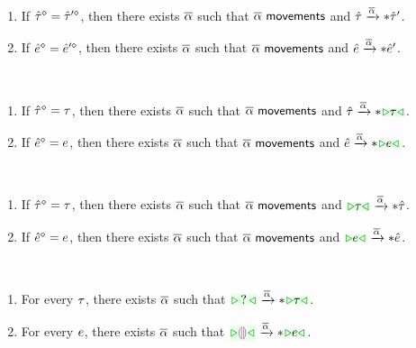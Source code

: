 \documentclass[formalism.tex]{subfiles}
\begin{document}
\begin{theorem}[name=Reachability] \
  \begin{enumerate}
    \item If $\hat{\tau}^{\diamond} = \hat{\tau}'^{\diamond}$, then there exists $\overline{\alpha}$ such that
      $\overline{\alpha} ~{\normalfont\textsf{movements}}$ and $\hat{\tau} \xrightarrow{\overline{\alpha}}* \hat{\tau}'$.

    \item If $\hat{e}^{\diamond} = \hat{e}'^{\diamond}$, then there exists $\overline{\alpha}$ such that
      $\overline{\alpha} ~{\normalfont\textsf{movements}}$ and $\hat{e} \xrightarrow{\overline{\alpha}}* \hat{e}'$.
  \end{enumerate}
\end{theorem}

\begin{lemma}[name=Reach Up] \
  \begin{enumerate}
    \item If $\hat{\tau}^{\diamond} = \tau$, then there exists $\overline{\alpha}$ such that $\overline{\alpha} ~{\normalfont\textsf{movements}}$
      and $\AUTActionIter{\ZTMV}{\ZTCursor{\TMV}}{\AIMV}$.

    \item If $\hat{e}^{\diamond} = e$, then there exists $\overline{\alpha}$ such that $\overline{\alpha} ~{\normalfont\textsf{movements}}$
      and $\AUEActionIter{\ZMV}{\ZTCursor{\EMV}}{\AIMV}$.
  \end{enumerate}
\end{lemma}

\begin{lemma}[name=Reach Down] \
  \begin{enumerate}
    \item If $\hat{\tau}^{\diamond} = \tau$, then there exists $\overline{\alpha}$ such that $\overline{\alpha} ~{\normalfont\textsf{movements}}$
      and $\AUTActionIter{\ZTCursor{\TMV}}{\ZTMV}{\AIMV}$.

    \item If $\hat{e}^{\diamond} = e$, then there exists $\overline{\alpha}$ such that $\overline{\alpha} ~{\normalfont\textsf{movements}}$
      and $\AUEActionIter{\ZTCursor{\EMV}}{\ZMV}{\AIMV}$.
  \end{enumerate}
\end{lemma}

\begin{theorem}[name=Constructability] \
  \begin{enumerate}
    \item For every $\tau$, there exists $\overline{\alpha}$ such that
      $\AUTActionIter{\ZTCursor{\TUnknown}}{\ZTCursor{\TMV}}{\AIMV}$.

    \item For every $e$, there exists $\overline{\alpha}$ such that
      $\AUEActionIter{\ZCursor{\EEHole}}{\ZCursor{\EMV}}{\AIMV}$.
  \end{enumerate}
\end{theorem}
\end{document}
